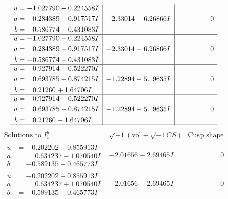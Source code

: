 \documentclass[1p]{elsarticle_modified}
\theoremstyle{definition}
\newcommand{\I}{\sqrt{-1}}
\begin{document}
$$\begin{array}{c|c|c}
\begin{aligned}
u &= -1.027790 + 0.224558 I \\
a &= \phantom{-}0.284389 - 0.917517 I \\
b &= -0.586774 + 0.431083 I\end{aligned}
 & -2.33014 - 6.26866 I & \phantom{-0.000000 } 0 \\ \hline\begin{aligned}
u &= -1.027790 - 0.224558 I \\
a &= \phantom{-}0.284389 + 0.917517 I \\
b &= -0.586774 - 0.431083 I\end{aligned}
 & -2.33014 + 6.26866 I & \phantom{-0.000000 } 0 \\ \hline\begin{aligned}
u &= \phantom{-}0.927914 + 0.522270 I \\
a &= \phantom{-}0.693785 + 0.874215 I \\
b &= \phantom{-}0.21260 + 1.64706 I\end{aligned}
 & -1.22894 + 5.19635 I & \phantom{-0.000000 } 0 \\ \hline\begin{aligned}
u &= \phantom{-}0.927914 - 0.522270 I \\
a &= \phantom{-}0.693785 - 0.874215 I \\
b &= \phantom{-}0.21260 - 1.64706 I\end{aligned}
 & -1.22894 - 5.19635 I & \phantom{-0.000000 } 0\\
 \hline 
 \end{array}$$\newpage$$\begin{array}{c|c|c}  
\text{Solutions to }I^u_{1}& \I (\text{vol} + \sqrt{-1}CS) & \text{Cusp shape}\\
 \hline 
\begin{aligned}
u &= -0.202202 + 0.855913 I \\
a &= \phantom{-}0.634237 - 1.070540 I \\
b &= -0.589135 + 0.465773 I\end{aligned}
 & -2.01656 + 2.69465 I & \phantom{-0.000000 } 0 \\ \hline\begin{aligned}
u &= -0.202202 - 0.855913 I \\
a &= \phantom{-}0.634237 + 1.070540 I \\
b &= -0.589135 - 0.465773 I\end{aligned}
 & -2.01656 - 2.69465 I & \phantom{-0.000000 } 0 \\ \hline\begin{aligned}

\end{aligned}
\end{array}$$
\end{document}
